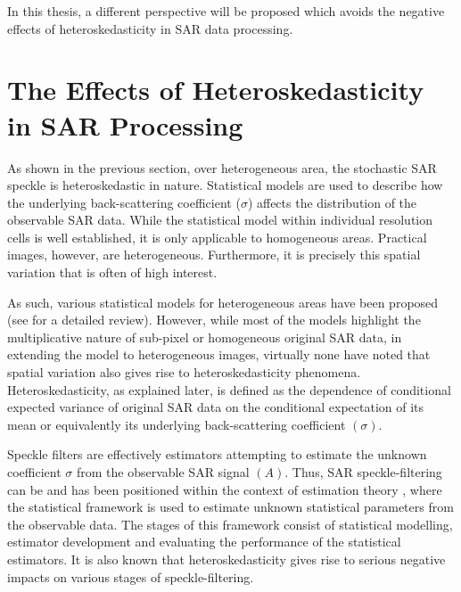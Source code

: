 In this thesis, a different perspective will be proposed which avoids the negative effects of heteroskedasticity in SAR data processing.
 
\section{The Effects of Heteroskedasticity in SAR Processing}%
\label{sec:heteroskedastic_sar_processing}


As shown in the previous section,
  over heterogeneous area, the stochastic SAR speckle is heteroskedastic in nature.
Statistical models are used to describe how the underlying back-scattering coefficient ($\sigma$) affects the distribution of the observable SAR data. 
While the statistical model within individual resolution cells is well established,
  it is only applicable to homogeneous areas.
Practical images, however, are heterogeneous.
Furthermore, it is precisely this spatial variation that is often of high interest.

As such, various statistical models for heterogeneous areas have been proposed (see \cite{Touzi_2002_TGRS} for a detailed review). 
However, while most of the models highlight the multiplicative nature of sub-pixel or homogeneous original SAR data, in extending the model to heterogeneous images, virtually none have noted that spatial variation also gives rise to heteroskedasticity phenomena. 
Heteroskedasticity, as explained later, is defined as the dependence of conditional expected variance of original SAR data on the conditional expectation of its mean or equivalently its underlying back-scattering coefficient $(\sigma)$. 

Speckle filters are effectively estimators attempting to estimate the unknown coefficient $\sigma$ from the observable SAR signal $(A)$. 
Thus, SAR speckle-filtering can be and has been positioned within the context of estimation theory \cite{Touzi_2002_TGRS}, where
the statistical framework is used to estimate unknown statistical parameters from the observable data. 
The stages of this framework consist of statistical modelling, estimator development and evaluating the performance of the statistical estimators. 
It is also known that heteroskedasticity gives rise to serious negative impacts on various stages of speckle-filtering. 

